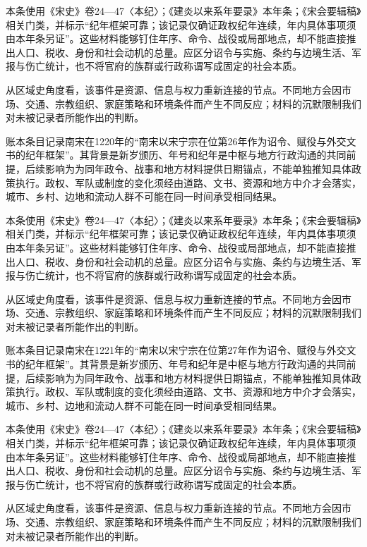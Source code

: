 本条使用《宋史》卷24—47〈本纪〉；《建炎以来系年要录》本年条；《宋会要辑稿》相关门类，并标示“纪年框架可靠；该记录仅确证政权纪年连续，年内具体事项须由本年条另证”。这些材料能够钉住年序、命令、战役或局部地点，却不能直接推出人口、税收、身份和社会动机的总量。应区分诏令与实施、条约与边境生活、军报与伤亡统计，也不将官府的族群或行政称谓写成固定的社会本质。

从区域史角度看，该事件是资源、信息与权力重新连接的节点。不同地方会因市场、交通、宗教组织、家庭策略和环境条件而产生不同反应；材料的沉默限制我们对未被记录者所能作出的判断。

账本条目记录南宋在1220年的“南宋以宋宁宗在位第26年作为诏令、赋役与外交文书的纪年框架”。其背景是新岁颁历、年号和纪年是中枢与地方行政沟通的共同前提，后续影响为为同年政令、战事和地方材料提供日期锚点，不能单独推知具体政策执行。政权、军队或制度的变化须经由道路、文书、资源和地方中介才会落实，城市、乡村、边地和流动人群不可能在同一时间承受相同结果。

本条使用《宋史》卷24—47〈本纪〉；《建炎以来系年要录》本年条；《宋会要辑稿》相关门类，并标示“纪年框架可靠；该记录仅确证政权纪年连续，年内具体事项须由本年条另证”。这些材料能够钉住年序、命令、战役或局部地点，却不能直接推出人口、税收、身份和社会动机的总量。应区分诏令与实施、条约与边境生活、军报与伤亡统计，也不将官府的族群或行政称谓写成固定的社会本质。

从区域史角度看，该事件是资源、信息与权力重新连接的节点。不同地方会因市场、交通、宗教组织、家庭策略和环境条件而产生不同反应；材料的沉默限制我们对未被记录者所能作出的判断。

账本条目记录南宋在1221年的“南宋以宋宁宗在位第27年作为诏令、赋役与外交文书的纪年框架”。其背景是新岁颁历、年号和纪年是中枢与地方行政沟通的共同前提，后续影响为为同年政令、战事和地方材料提供日期锚点，不能单独推知具体政策执行。政权、军队或制度的变化须经由道路、文书、资源和地方中介才会落实，城市、乡村、边地和流动人群不可能在同一时间承受相同结果。

本条使用《宋史》卷24—47〈本纪〉；《建炎以来系年要录》本年条；《宋会要辑稿》相关门类，并标示“纪年框架可靠；该记录仅确证政权纪年连续，年内具体事项须由本年条另证”。这些材料能够钉住年序、命令、战役或局部地点，却不能直接推出人口、税收、身份和社会动机的总量。应区分诏令与实施、条约与边境生活、军报与伤亡统计，也不将官府的族群或行政称谓写成固定的社会本质。

从区域史角度看，该事件是资源、信息与权力重新连接的节点。不同地方会因市场、交通、宗教组织、家庭策略和环境条件而产生不同反应；材料的沉默限制我们对未被记录者所能作出的判断。

